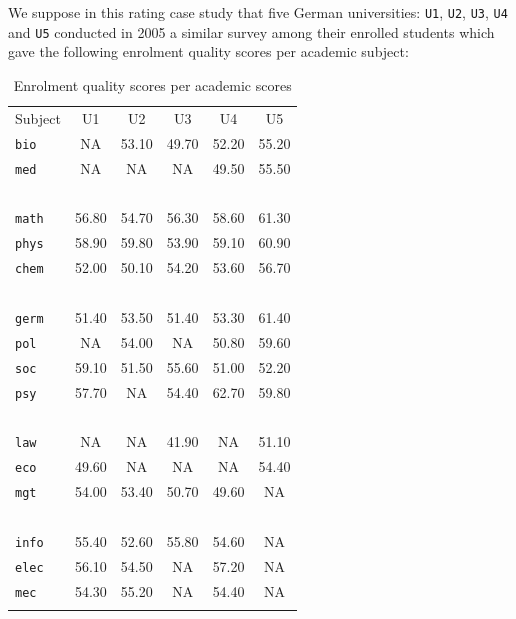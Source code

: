 We suppose in this rating case study that five German universities: \texttt{U1}, \texttt{U2}, \texttt{U3}, \texttt{U4} and \texttt{U5} conducted in 2005 a similar survey among their enrolled students which gave the following enrolment quality scores per academic subject:
\begin{table}[ht]
\caption{Enrolment quality scores per academic scores}
\label{tab:14.1}       %
\begin{center}
    \begin{tabular}{l|c|c|c|c|c}
      \svhline\noalign{\smallskip}
      Subject & U1 & U2 & U3 & U4 & U5 \\
      \noalign{\smallskip}\hline\noalign{\smallskip}
      \texttt{bio}   & NA     & 53.10 & 49.70 & 52.20 & 55.20\\
      \texttt{med}   & NA     & NA    & NA    & 49.50 & 55.50\\
      \              & \      & \     & \     & \     & \    \\
      \texttt{math}  & 56.80  & 54.70 & 56.30 & 58.60 & 61.30\\
      \texttt{phys}  & 58.90  & 59.80 & 53.90 & 59.10 & 60.90\\
      \texttt{chem}  & 52.00  & 50.10 & 54.20 & 53.60 & 56.70\\
      \              & \      & \     & \     & \     & \    \\
      \texttt{germ}  & 51.40  & 53.50 & 51.40 & 53.30 & 61.40\\
      \texttt{pol}   & NA     & 54.00 & NA    & 50.80 & 59.60\\
      \texttt{soc}   & 59.10  & 51.50 & 55.60 & 51.00 & 52.20\\
      \texttt{psy}   & 57.70  & NA    & 54.40 & 62.70 & 59.80\\
      \              & \      & \     & \     & \     & \    \\
      \texttt{law}   & NA     & NA    & 41.90 & NA    & 51.10\\
      \texttt{eco}   & 49.60  & NA    & NA    & NA    & 54.40\\
      \texttt{mgt}   & 54.00  & 53.40 & 50.70 & 49.60 & NA   \\
      \              & \      & \     & \     & \     & \    \\
      \texttt{info}  & 55.40  & 52.60 & 55.80 & 54.60 & NA   \\ 
      \texttt{elec}  & 56.10  & 54.50 & NA    & 57.20 & NA   \\
      \texttt{mec}   & 54.30  & 55.20 & NA    & 54.40 & NA   \\
      \noalign{\smallskip}\hline
    \end{tabular}
\end{center}
\end{table}

